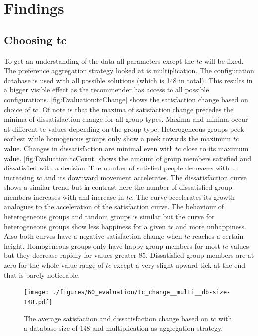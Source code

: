\section{Findings}
\label{sec:Evaluation:Findings}

\subsection{Choosing tc}

To get an understanding of the data all parameters except the $tc$ will be fixed. The preference aggregation strategy looked at is multiplication. The configuration database is used with all possible solutions (which is 148 in total). This results in a bigger visible effect as the recommender has access to all possible configurations. \autoref{fig:Evaluation:tcChange} shows the satisfaction change based on choice of $tc$. Of note is that the maxima of satisfaction change precedes the minima of dissatisfaction change for all group types. Maxima and minima occur at different tc values depending on the group type. Heterogeneous groups peek earliest while homogenous groups only show a peek towards the maximum $tc$ value. Changes in dissatisfaction are minimal even with $tc$ close to its maximum value. \autoref{fig:Evaluation:tcCount} shows the amount of group members satisfied and dissatisfied with a decision. The number of satisfied people decreases with an increasing $tc$ and its downward movement accelerates. The dissatisfaction curve shows a similar trend but in contrast here the number of dissatisfied group members increases with and increase in $tc$. The curve accelerates its growth analogues to the acceleration of the satisfaction curve. The behaviour of heterogeneous groups and random groups is similar but the curve for heterogeneous groups show less happiness for a given tc and more unhappiness. Also both curves have a negative satisfaction change when $tc$ reaches a certain height. Homogeneous groups only have happy group members for most $tc$ values but they decrease rapidly for values greater $85$. Dissatisfied group members are at zero for the whole value range of $tc$ except a very slight upward tick at the end that is barely noticeable.

\begin{figure}
    \centering
    \texttt{[image: ./figures/60\_evaluation/tc\_change\_\_multi\_\_db-size-148.pdf]}
    \caption{The average satisfaction and dissatisfaction change based on $tc$ with a database size of 148 and multiplication as aggregation strategy.}
    \label{fig:Evaluation:tcChange}
\end{figure}

